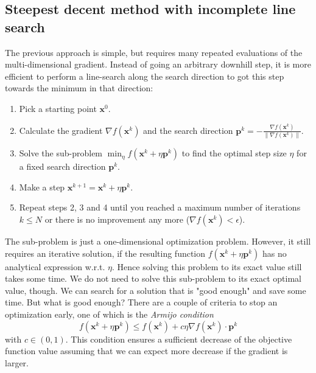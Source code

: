\subsection{Steepest decent method with incomplete line search}
The previous approach is simple, but requires many repeated evaluations of the multi-dimensional gradient. Instead of going an arbitrary downhill step, it is more efficient to perform a line-search along the search direction to got this step towards the minimum in that direction: 
\begin{enumerate}
    \item Pick a starting point $\mathbf{x}^0$.
    \item Calculate the gradient $\nabla f(\mathbf{x}^k)$ and the search direction $\mathbf{p}^k = - \frac{\nabla f(\mathbf{x}^k)}{\lVert \nabla f(\mathbf{x}^k) \rVert}$.
    \item Solve the sub-problem $\min_{\eta} f(\mathbf{x}^k + \eta \mathbf{p}^k)$ to find the optimal step size $\eta$ for a fixed search direction $\mathbf{p}^k$.
    \item Make a step $\mathbf{x}^{k+1} = \mathbf{x}^k + \eta \mathbf{p}^k$.
    \item Repeat steps 2, 3 and 4 until you reached a maximum number of iterations $k \le N$ or there is no improvement any more ($ \nabla f(\mathbf{x}^k) < \epsilon$). 
\end{enumerate}

The sub-problem is just a one-dimensional optimization problem. However, it still requires an iterative solution, if the resulting function $f(\mathbf{x}^k + \eta \mathbf{p}^k)$ has no analytical expression w.r.t. $\eta$. Hence solving this problem to its exact value still takes some time. We do not need to solve this sub-problem to its exact optimal value, though. We can search for a solution that is "good enough" and save some time. But what is good enough?
There are a couple of criteria to stop an optimization early, one of which is the \emph{Armijo condition} 
\begin{equation}
    f(\mathbf{x}^k + \eta \mathbf{p}^k) \le f(\mathbf{x}^k) + c \eta  \nabla f(\mathbf{x}^k) \cdot \mathbf{p}^k 
\end{equation}
with $c \in (0,1)$. This condition ensures a sufficient decrease of the objective function value assuming that we can expect more decrease if the gradient is larger. 

